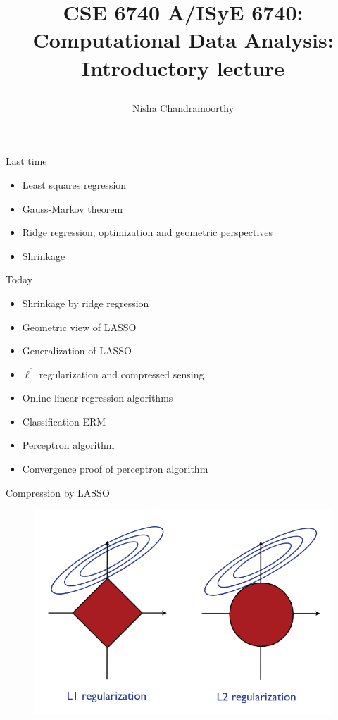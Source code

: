 \documentclass[final]{beamer}
\title{\begin{huge}{CSE 6740 A/ISyE 6740: Computational Data Analysis: Introductory lecture}\end{huge}} %
\author{Nisha Chandramoorthy} %
\begin{document}
\frame{\titlepage}

\begin{frame}{Last time}
\begin{itemize}
	\item Least squares regression
	\pause 
	\item Gauss-Markov theorem
	\pause 
	\item Ridge regression, optimization and geometric perspectives
	\pause
	\item Shrinkage
\end{itemize}
\end{frame}
\begin{frame}{Today}
\begin{itemize}
	\item Shrinkage by ridge regression
	\pause
	\item Geometric view of LASSO
	\pause
	\item Generalization of LASSO 
	\pause 
	\item $\ell^0$ regularization and compressed sensing
	\pause
\end{itemize}
\end{frame}
\begin{frame}
	\begin{itemize}
	\item Online linear regression algorithms
	\pause 
	\item Classification ERM
	\pause
	\item Perceptron algorithm
	\pause
	\item Convergence proof of perceptron algorithm 
	\end{itemize}
\end{frame}
\begin{frame}{Compression by LASSO}
	\begin{figure}
		\includegraphics[width=\textwidth]{lasso.png}
	\end{figure}
\end{frame}
\end{document}
